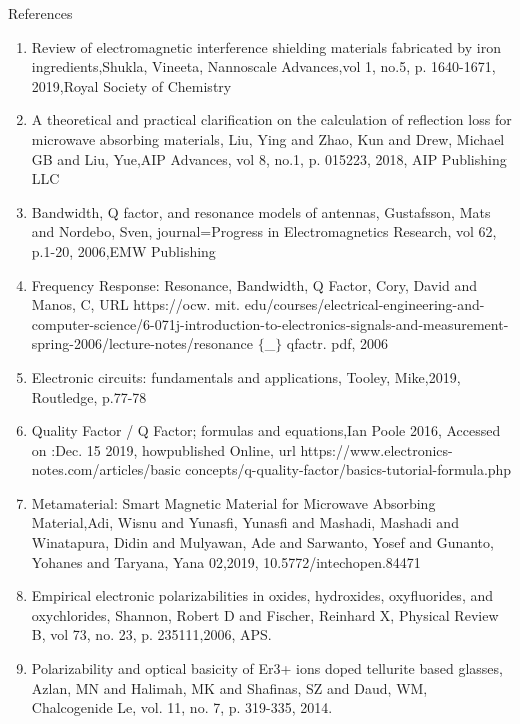 \documentclass[11pt,aspect ratio=169]{beamer}
\begin{document}
\begin{frame}[allowframebreaks]{References}
	\begin{enumerate}
	
\item
	Review of electromagnetic interference shielding materials fabricated by iron ingredients,Shukla, Vineeta,
	Nannoscale Advances,vol 1,
	no.5,
	p. 1640-1671,
	2019,Royal Society of Chemistry


\item
	A theoretical and practical clarification on the calculation of reflection loss for microwave absorbing materials,
	Liu, Ying and Zhao, Kun and Drew, Michael GB and Liu, Yue,AIP Advances,
	vol 8,
	no.1,
	p. 015223, 2018, AIP Publishing LLC


\item
	Bandwidth, Q factor, and resonance models of antennas,
	Gustafsson, Mats and Nordebo, Sven,
	journal={Progress in Electromagnetics Research},
	vol 62,
	p.1-20, 2006,EMW Publishing

\item
	Frequency Response: Resonance, Bandwidth, Q Factor,
	Cory, David and Manos, C, URL https://ocw. mit. edu/courses/electrical-engineering-and-computer-science/6-071j-introduction-to-electronics-signals-and-measurement-spring-2006/lecture-notes/resonance $\{$\_$\}$ qfactr. pdf, 2006

\item
	Electronic circuits: fundamentals and applications,
	Tooley, Mike,2019, Routledge,
	p.77-78

\item
	Quality Factor / Q Factor; formulas and equations,Ian Poole
	2016,
	Accessed on :Dec. 15 2019,
	howpublished Online,
	url https://www.electronics-notes.com/articles/basic concepts/q-quality-factor/basics-tutorial-formula.php

\item
	Metamaterial: Smart Magnetic Material for Microwave Absorbing Material,Adi, Wisnu and Yunasfi, Yunasfi and Mashadi, Mashadi and Winatapura, Didin and Mulyawan, Ade and Sarwanto, Yosef and Gunanto, Yohanes and Taryana, Yana
     02,2019,
	10.5772/intechopen.84471

\item 
Empirical electronic polarizabilities in oxides, hydroxides, oxyfluorides, and oxychlorides,
Shannon, Robert D and Fischer, Reinhard X,
Physical Review B,	vol 73,	no. 23,	p. 235111,2006,	APS.

\item
 Polarizability and optical basicity of Er3+ ions doped tellurite based glasses,
	Azlan, MN and Halimah, MK and Shafinas, SZ and Daud, WM,
Chalcogenide Le,	vol. 11,	no. 7,	p. 319-335,	2014.


\end{enumerate}
\end{frame}
\end{document}
